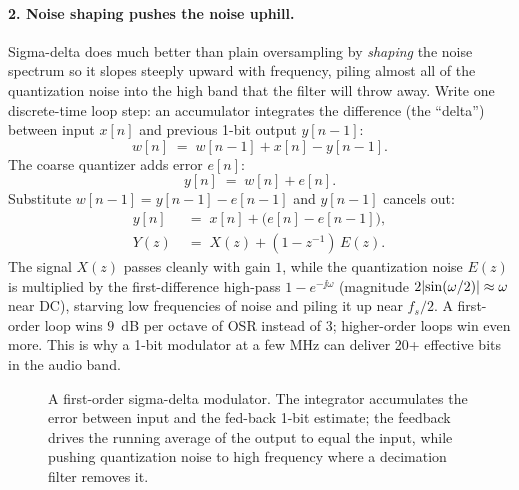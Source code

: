 \paragraph{2. Noise shaping pushes the noise uphill.} Sigma-delta does much better than plain
oversampling by \emph{shaping} the noise spectrum so it slopes steeply upward with frequency,
piling almost all of the quantization noise into the high band that the filter will throw away. Write one discrete-time loop step: an accumulator integrates the difference (the ``delta'') between input $x[n]$ and previous 1-bit output $y[n-1]$:
\[
  w[n] \;=\; w[n-1] + x[n] - y[n-1].
\]
The coarse quantizer adds error $e[n]$:
\[
  y[n] \;=\; w[n] + e[n].
\]
Substitute $w[n-1] = y[n-1] - e[n-1]$ and $y[n-1]$ cancels out:
\begin{align*}
  y[n] \;&=\; x[n] + \bigl(e[n] - e[n-1]\bigr), \\
  Y(z) \;&=\; X(z) + (1 - z^{-1})\,E(z).
\end{align*}
The signal $X(z)$ passes cleanly with gain $1$, while the quantization noise $E(z)$ is multiplied by the first-difference high-pass $1 - e^{-\jj\omega}$ (magnitude $2\lvert\sin(\omega/2)\rvert \approx \omega$ near DC), starving low frequencies of noise and piling it up near $f_s/2$. A first-order loop wins $9$~dB per octave of OSR instead of $3$; higher-order loops win even more. This is
why a 1-bit modulator at a few MHz can deliver 20+ effective bits in the audio band.

\begin{figure}[H]
\centering
{}
\caption{A first-order sigma-delta modulator. The integrator accumulates the error between input
and the fed-back 1-bit estimate; the feedback drives the running average of the output to equal
the input, while pushing quantization noise to high frequency where a decimation filter removes
it.}
\label{ch19:fig-sigmadelta}
\end{figure}

